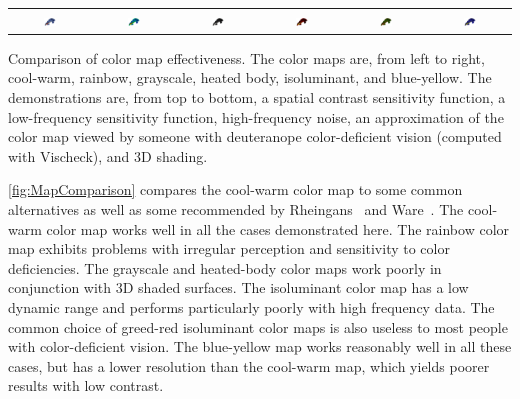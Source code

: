 \documentclass{llncs}
\begin{document}
\begin{plate*}
\begin{tabular}{c@{\,}c@{\,}c@{\,}c@{\,}c@{\,}c}
    \includegraphics[width=0.16\textwidth]{images/Cool2WarmShading} &
    \includegraphics[width=0.16\textwidth]{images/RainbowShading} &
    \includegraphics[width=0.16\textwidth]{images/GrayscaleShading} &
    \includegraphics[width=0.16\textwidth]{images/BlackBodyShading} &
    \includegraphics[width=0.16\textwidth]{images/Green2RedShading} &
    \includegraphics[width=0.16\textwidth]{images/Blue2YellowShading}
  \end{tabular}
  \caption{Comparison of color map effectiveness.  The color maps are, from
    left to right, cool-warm, rainbow, grayscale, heated body, isoluminant,
    and blue-yellow.  The demonstrations are, from top to bottom, a spatial
    contrast sensitivity function, a low-frequency sensitivity function,
    high-frequency noise, an approximation of the color map viewed by
    someone with deuteranope color-deficient vision (computed with
    Vischeck), and 3D shading.}
  \label{fig:MapComparison}
\end{plate*}

\autoref{fig:MapComparison} compares the cool-warm color map to some
common alternatives as well as some recommended by
Rheingans~\cite{Rheingans99} and Ware~\cite{Ware04}.  The cool-warm color
map works well in all the cases demonstrated here.  The rainbow color map
exhibits problems with irregular perception and sensitivity to color
deficiencies.  The grayscale and heated-body color maps work poorly in
conjunction with 3D shaded surfaces.  The isoluminant color map has a low
dynamic range and performs particularly poorly with high frequency data.
The common choice of greed-red isoluminant color maps is also useless to
most people with color-deficient vision.  The blue-yellow map works
reasonably well in all these cases, but has a lower resolution than the
cool-warm map, which yields poorer results with low contrast.
\end{document}
